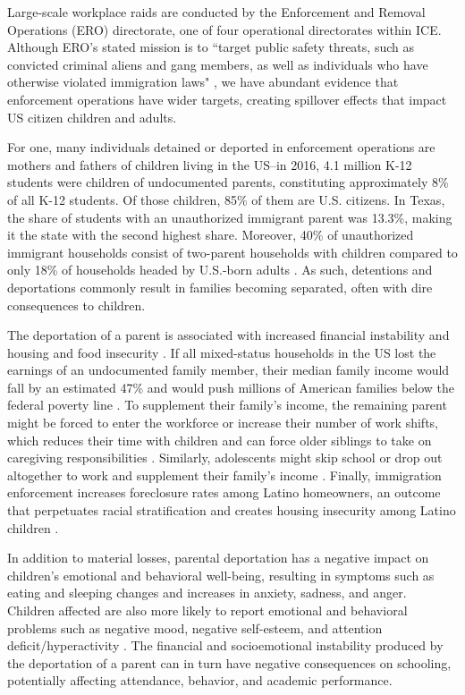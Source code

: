 \documentclass[hidelinks,twoside]{article}
\begin{document}
Large-scale workplace raids are conducted by the Enforcement and Removal Operations (ERO) directorate, one of four operational directorates within ICE. Although ERO’s stated mission is to “target public safety threats, such as convicted criminal aliens and gang members, as well as individuals who have otherwise violated immigration laws" \citep{usimmigrationandcustomsenforcement_2023_who}, we have abundant evidence that enforcement operations have wider targets, creating spillover effects that impact US citizen children and adults. 

For one, many individuals detained or deported in enforcement operations are mothers and fathers of children living in the US–in 2016, 4.1 million K-12 students were children of undocumented parents, constituting approximately 8\% of all K-12 students. Of those children, 85\% of them are U.S. citizens. In Texas, the share of students with an unauthorized immigrant parent was 13.3\%, making it the state with the second highest share. Moreover, 40\% of unauthorized immigrant households consist of two-parent households with children compared to only 18\% of households headed by U.S.-born adults \citep{passel_2016_children}. As such, detentions and deportations commonly result in families becoming separated, often with dire consequences to children. 

The deportation of a parent is associated with increased financial instability and housing and food insecurity \citep{capps_2015_implications, chaudry_2010_children, dreby_2012_the, preston_2020_the, warren_2017_mass}. If all mixed-status households in the US lost the earnings of an undocumented family member, their median family income would fall by an estimated 47\% and would push millions of American families below the federal poverty line \citep{preston_2020_the,warren_2017_mass}. To supplement their family’s income, the remaining parent might be forced to enter the workforce or increase their number of work shifts, which reduces their time with children and can force older siblings to take on caregiving responsibilities \citep{dreby_2012_the}. Similarly, adolescents might skip school or drop out altogether to work and supplement their family’s income \citep{chaudry_2010_children}. Finally, immigration enforcement increases foreclosure rates among Latino homeowners, an outcome that perpetuates racial stratification and creates housing insecurity among Latino children \citep{rugh_2016_deporting}.

In addition to material losses, parental deportation has a negative impact on children's emotional and behavioral well-being, resulting in symptoms such as eating and sleeping changes and increases in anxiety, sadness, and anger. Children affected are also more likely to report emotional and behavioral problems such as negative mood, negative self-esteem, and attention deficit/hyperactivity \citep{brabeck_2011_framing, dreby_2012_the, hagan_2010_number, gulbas_2016_deportation, delva_2013_mental, zayas_2015_the}. The financial and socioemotional instability produced by the deportation of a parent can in turn have negative consequences on schooling, potentially affecting attendance, behavior, and academic performance.  
\end{document}
